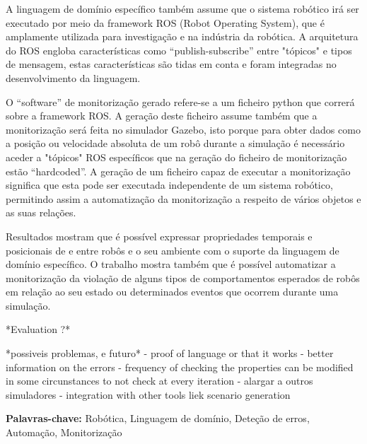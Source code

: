 A linguagem de domínio específico também assume que o sistema robótico irá ser executado por meio da framework ROS (Robot Operating System), que é amplamente utilizada para investigação e na indústria da robótica. A arquitetura do ROS engloba características como “publish-subscribe” entre "tópicos" e tipos de mensagem, estas características são tidas em conta e foram integradas no desenvolvimento da linguagem.

O “software” de monitorização gerado refere-se a um ficheiro python que correrá sobre a framework ROS. A geração deste ficheiro assume também que a monitorização será feita no simulador Gazebo, isto porque para obter dados como a posição ou velocidade absoluta de um robô durante a simulação é necessário aceder a "tópicos" ROS específicos que na geração do ficheiro de monitorização estão “hardcoded”. A geração de um ficheiro capaz de executar a monitorização significa que esta pode ser executada independente de um sistema robótico, permitindo assim a automatização da monitorização a respeito de vários objetos e as suas relações.

Resultados mostram que é possível expressar propriedades temporais e posicionais de e entre robôs e o seu ambiente com o suporte da linguagem de domínio específico. O trabalho mostra também que é possível automatizar a monitorização da violação de alguns tipos de comportamentos esperados de robôs em relação ao seu estado ou determinados eventos que ocorrem durante uma simulação.

*Evaluation ?*

*possiveis problemas, e futuro* - proof of language or that it works - better information on the errors - frequency of checking the properties can be modified in some circunstances to not check at every iteration - alargar a outros simuladores - integration with other tools liek scenario generation


\vfill

\begin{flushleft}
\textbf{Palavras-chave:}
Robótica, Linguagem de domínio, Deteção de erros, Automação, Monitorização
\end{flushleft}

